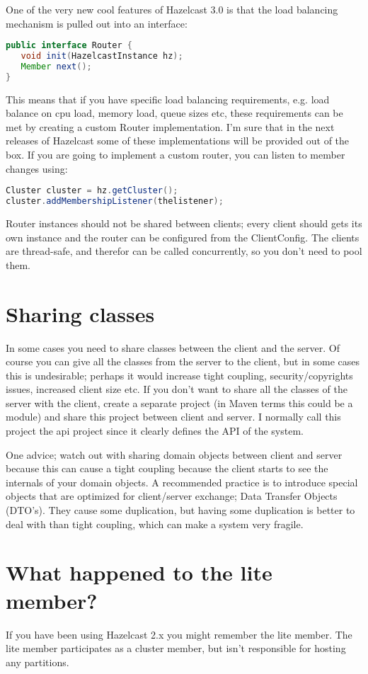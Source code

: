 One of the very new cool features of Hazelcast 3.0 is that the load balancing mechanism is pulled out into an interface:
\begin{lstlisting}[language=java]
public interface Router {
   void init(HazelcastInstance hz);
   Member next();
}
\end{lstlisting}
This means that if you have specific load balancing requirements, e.g. load balance on cpu load, memory load, queue sizes etc, these requirements can be met by creating a custom Router implementation. I'm sure that in the next releases of Hazelcast some of these implementations will be provided out of the box. If you are going to implement a custom router, you can listen to member changes using:
\begin{lstlisting}[language=java]
Cluster cluster = hz.getCluster();
cluster.addMembershipListener(thelistener);
\end{lstlisting}
Router instances should not be shared between clients; every client should gets its own instance and the router can be configured from the ClientConfig. The clients are thread-safe, and therefor can be called concurrently, so you don't need to pool them.

\section{Sharing classes}
In some cases you need to share classes between the client and the server. Of course you can give all the classes from the server to the client, but in some cases this is undesirable; perhaps it would increase tight coupling, security/copyrights issues, increased client size etc. If you don't want to share all the classes of the server with the client, create a separate project (in Maven terms this could be a module) and share this project between client and server. I normally call this project the api project since it clearly defines the API of the system. 

One advice; watch out with sharing domain objects between client and server because this can cause a tight coupling because the client starts to see the internals of your domain objects. A recommended practice is to introduce special objects that are optimized for client/server exchange; Data Transfer Objects (DTO's). They cause some duplication, but having some duplication is better to deal with than tight coupling, which can make a system very fragile.

\section{What happened to the lite member?}
If you have been using Hazelcast 2.x you might remember the lite member. The lite member participates as a cluster member, but isn't responsible for hosting any partitions. 

